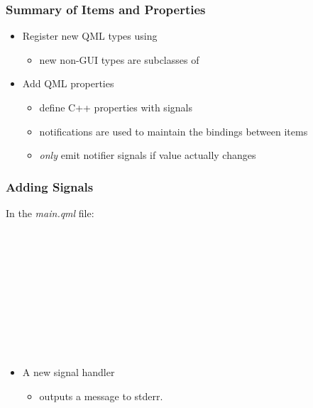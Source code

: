 \begin{slide}\frametitle{Summary of Items and Properties}

\begin{itemize}
\item Register new QML types using 
  \begin{itemize}
  \item new non-GUI types are subclasses of 
  \end{itemize}
\vspace*{0.5em}
\item Add QML properties
  \begin{itemize}
  \item define C++ properties with  signals
  \item notifications are used to maintain the bindings between items
  \item \emph{only} emit notifier signals if value actually changes
  \end{itemize}
\end{itemize}

\end{slide}






\begin{slide}[fragile]\frametitle{Adding Signals}

In the \textit{main.qml} file:

\begin{qml}
\vspace*{0.5em}
\\
\\
\vspace*{0.5em}
\\
\\
\vspace*{0.5em}
\\
\\
\qtt{~~~~~~~~\}}\\
\qtt{~~~~\}}\\
\qtt{\}}\\
\end{qml}

\begin{itemize}
\item A new  signal handler
  \begin{itemize}
  \item outputs a message to stderr.
  \end{itemize}
\end{itemize}

\end{slide}


